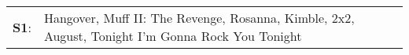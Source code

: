 \begin{supertabular}{p{0.03\textwidth}p{0.92\textwidth}}
 \textbf{S1}:  &  Hangover\textsuperscript{}, \enspace Muff II: The Revenge\textsuperscript{}, \enspace Rosanna\textsuperscript{}, \enspace Kimble\textsuperscript{}, \enspace 2x2\textsuperscript{}, \enspace August\textsuperscript{}, \enspace Tonight I'm Gonna Rock You Tonight\textsuperscript{}  \enspace  \\
\end{supertabular}
